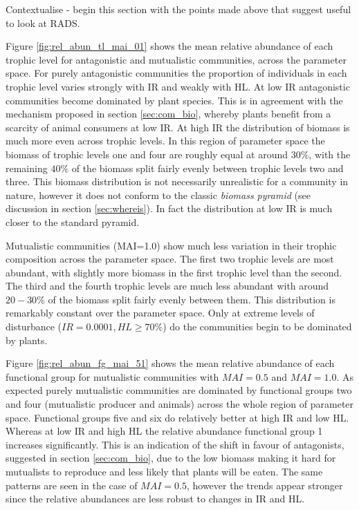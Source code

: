 \begin{itemize}
Contextualise - begin this section with the points made above that suggest useful to look at RADS.

Figure \ref{fig:rel_abun_tl_mai_01} shows the mean relative abundance of each trophic level for antagonistic and mutualistic communities, across the parameter space.  For purely antagonistic communities the proportion of individuals in each trophic level varies strongly with IR and weakly with HL. At low IR antagonistic communities become dominated by plant species. This is in agreement with the mechanism proposed in section \ref{sec:com_bio}, whereby plants benefit from a scarcity of animal consumers at low IR. At high IR the distribution of biomass is much more even across trophic levels. In this region of parameter space the biomass of trophic levels one and four are roughly equal at around $30\%$, with the remaining $40\%$ of the biomass split fairly evenly between trophic levels two and three. This biomass distribution is not necessarily unrealistic for a community in nature, however it does not conform to the classic \emph{biomass pyramid} (see discussion in section \ref{sec:whereis}). In fact the distribution at low IR is much closer to the standard pyramid.

Mutualistic communities (MAI=1.0) show much less variation in their trophic composition across the parameter space. The first two trophic levels are most abundant, with slightly more biomass in the first trophic level than the second. The third and the fourth trophic levels are much less abundant with around $20-30\%$ of the biomass split fairly evenly between them. This distribution is remarkably constant over the parameter space. Only at extreme levels of disturbance ($IR=0.0001, HL\geq 70 \%$) do the communities begin to be dominated by plants. 

Figure \ref{fig:rel_abun_fg_mai_51} shows the mean relative abundance of each functional group for mutualistic communities with $MAI=0.5$ and $MAI=1.0$. As expected purely mutualistic communities are dominated by functional groups two and four (mutualistic producer and animals) across the whole region of parameter space. Functional groups five and six do relatively better at high IR and low HL. Whereas at low IR and high HL the relative abundance functional group 1 increases significantly. This is an indication of the shift in favour of antagonists, suggested in section \ref{sec:com_bio}, due to the low biomass making it hard for mutualists to reproduce and less likely that plants will be eaten. The same patterns are seen in the case of $MAI=0.5$, however the trends appear stronger since the relative abundances are less robust to changes in IR and HL.     




\end{itemize}
